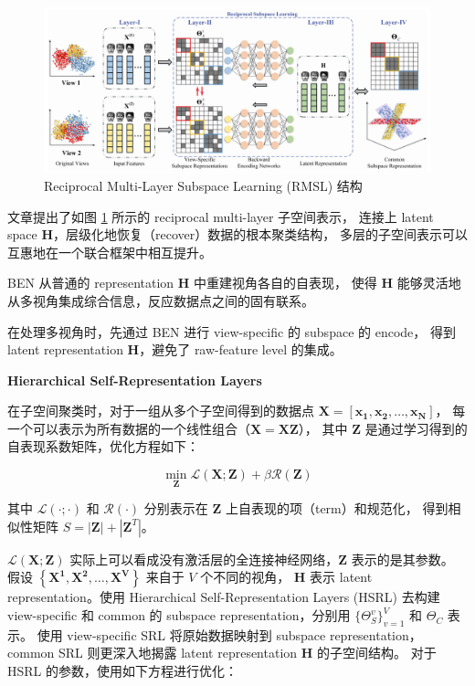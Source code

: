 \documentclass[UTF8]{ctexart}
\begin{document}
\begin{figure}[ht]
    \centering
    \includegraphics[scale=0.32]{Week09_RMSL.png}
    \caption{Reciprocal Multi-Layer Subspace Learning (RMSL) 结构}
    \label{fig:RMSL}
\end{figure}

文章提出了如图 \ref{fig:RMSL} 所示的 reciprocal multi-layer 子空间表示，
连接上 latent space $\mathbf{H}$，层级化地恢复（recover）数据的根本聚类结构，
多层的子空间表示可以互惠地在一个联合框架中相互提升。

BEN 从普通的 representation $\mathbf{H}$ 中重建视角各自的自表现，
使得 $\mathbf{H}$ 能够灵活地从多视角集成综合信息，反应数据点之间的固有联系。

在处理多视角时，先通过 BEN 进行 view-specific 的 subspace 的 encode，
得到 latent representation $\mathbf{H}$，避免了 raw-feature level 的集成。

\textbf{Hierarchical Self-Representation Layers}

在子空间聚类时，对于一组从多个子空间得到的数据点 $\mathbf{X} = \left[\mathbf{x_1}, \mathbf{x_2}, \dots, \mathbf{x_N}\right]$，
每一个可以表示为所有数据的一个线性组合（$\mathbf{X} = \mathbf{X}\mathbf{Z}$），
其中 $\mathbf{Z}$ 是通过学习得到的自表现系数矩阵，优化方程如下：

$$
\min_{\mathbf{Z}}\mathcal{L}(\mathbf{X; \mathbf{Z}}) + \beta\mathcal{R}(\mathbf{Z})
$$

其中 $\mathcal{L}(\cdot; \cdot)$ 和 $\mathcal{R}(\cdot)$ 分别表示在 $\mathbf{Z}$ 上自表现的项（term）和规范化，
得到相似性矩阵 $S = |\mathbf{Z}| + |\mathbf{Z}^T|$。

$\mathcal{L}(\mathbf{X; \mathbf{Z}})$ 实际上可以看成没有激活层的全连接神经网络，$\mathbf{Z}$ 表示的是其参数。
假设 $\left\{\mathbf{X^1}, \mathbf{X^2}, \dots, \mathbf{X^V}\right\}$ 来自于 $V$ 个不同的视角，
$\mathbf{H}$ 表示 latent representation。使用 Hierarchical Self-Representation Layers (HSRL) 去构建 view-specific 和 common
的 subspace representation，分别用 $\{\Theta_S^v\}_{v=1}^V$ 和 $\Theta_C$ 表示。
使用 view-specific SRL 将原始数据映射到 subspace representation，common SRL 则更深入地揭露 latent representation $\mathbf{H}$ 的子空间结构。
对于 HSRL 的参数，使用如下方程进行优化：
\end{document}
